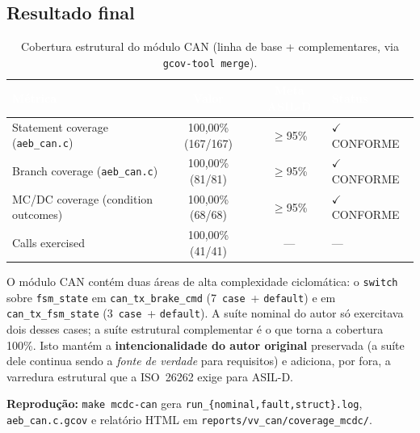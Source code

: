\documentclass[12pt]{article}
\begin{document}
\subsection{Resultado final}

\begin{table}[H]
\centering
\caption{Cobertura estrutural do módulo CAN (linha de base + complementares, via \texttt{gcov-tool merge}).}
\footnotesize
\begin{tabular}{|l|c|c|l|}
\hline
\rowcolor{sectionblue}
\textcolor{white}{\textbf{Métrica}} &
\textcolor{white}{\textbf{Valor}} &
\textcolor{white}{\textbf{Meta ASIL-D}} &
\textcolor{white}{\textbf{Status}} \\ \hline
Statement coverage (\texttt{aeb\_can.c})  & 100{,}00\% (167/167) & $\geq$95\% & $\checkmark$ CONFORME \\ \hline
Branch coverage (\texttt{aeb\_can.c})     & 100{,}00\% (81/81)   & $\geq$95\% & $\checkmark$ CONFORME \\ \hline
MC/DC coverage (condition outcomes)       & 100{,}00\% (68/68)   & $\geq$95\% & $\checkmark$ CONFORME \\ \hline
Calls exercised                           & 100{,}00\% (41/41)   & ---        & --- \\ \hline
\end{tabular}
\end{table}

\begin{tcolorbox}[colback=ddbrownlight, colframe=ddbrown,
                  title=\textbf{Observação de implementação}]
O módulo CAN contém duas áreas de alta complexidade ciclomática: o \texttt{switch} sobre
\texttt{fsm\_state} em \texttt{can\_tx\_brake\_cmd} (7~\texttt{case}~+ \texttt{default}) e em
\texttt{can\_tx\_fsm\_state} (3~\texttt{case}~+ \texttt{default}). A suíte nominal do autor só
exercitava dois desses cases; a suíte estrutural complementar é o que torna a cobertura 100\%.
Isto mantém a \textbf{intencionalidade do autor original} preservada (a suíte dele continua sendo a
\textit{fonte de verdade} para requisitos) e adiciona, por fora, a varredura estrutural que a ISO~26262
exige para ASIL-D.
\end{tcolorbox}

\textbf{Reprodução:} \texttt{make mcdc-can} gera \texttt{run\_\{nominal,fault,struct\}.log},
\texttt{aeb\_can.c.gcov} e relatório HTML em \texttt{reports/vv\_can/coverage\_mcdc/}.

\end{document}
